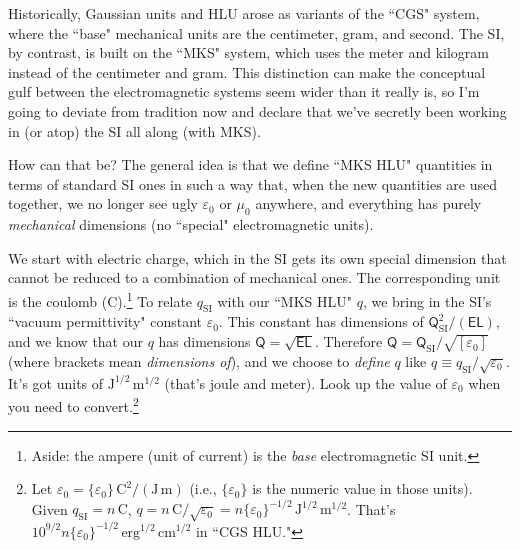 \documentclass[12pt]{article}
\begin{document}
Historically, Gaussian units and HLU arose as variants of the ``CGS" system, where the ``base" mechanical units are the centimeter, gram, and second. The SI, by contrast, is built on the ``MKS" system, which uses the meter and kilogram instead of the centimeter and gram. This distinction can make the conceptual gulf between the electromagnetic systems seem wider than it really is, so I'm going to deviate from tradition now and declare that we've secretly been working in (or atop) the SI all along (with MKS).

How can that be? The general idea is that we define ``MKS HLU" quantities in terms of standard SI ones in such a way that, when the new quantities are used together, we no longer see ugly $\varepsilon_0$ or $\mu_0$ anywhere, and everything has purely \emph{mechanical} dimensions (no ``special" electromagnetic units).

We start with electric charge, which in the SI gets its own special dimension that cannot be reduced to a combination of mechanical ones. The corresponding unit is the coulomb ($\textrm{C}$).\footnote{Aside: the ampere (unit of current) is the \emph{base} electromagnetic SI unit.} To relate $q_{\textrm{SI}}$ with our ``MKS HLU" $q$, we bring in the SI's ``vacuum permittivity" constant $\varepsilon_0$. This constant has dimensions of $\mathsf{Q}_{\textrm{SI}}^2 / (\mathsf{E} \mathsf{L})$, and we know that our $q$ has dimensions $\mathsf{Q} = \sqrt{\mathsf{E}\mathsf{L}}$. Therefore $\mathsf{Q} = \mathsf{Q}_{\textrm{SI}} / \sqrt{[\varepsilon_0]}$ (where brackets mean \emph{dimensions of}), and we choose to \emph{define} $q$ like $q \equiv q_{\textrm{SI}} / \sqrt{\varepsilon_0}$. It's got units of $\textrm{J}^{1/2} \, \textrm{m}^{1/2}$ (that's joule and meter). Look up the value of $\varepsilon_0$ when you need to convert.\footnote{Let $\varepsilon_{0} = \{ \varepsilon_0 \} \, \textrm{C}^2 / (\textrm{J} \, \textrm{m})$ (i.e., $\{ \varepsilon_0 \}$ is the numeric value in those units). Given $q_{\textrm{SI}} = n \, \textrm{C}$, $ q = n \, \textrm{C} / \sqrt{\varepsilon_0} = n \{ \varepsilon_0 \}^{-1/2} \, \textrm{J}^{1/2} \, \textrm{m}^{1/2}$. That's $10^{9/2} n \{ \varepsilon_0 \}^{-1/2} \, \textrm{erg}^{1/2} \, \textrm{cm}^{1/2}$ in ``CGS HLU."}
\end{document}
